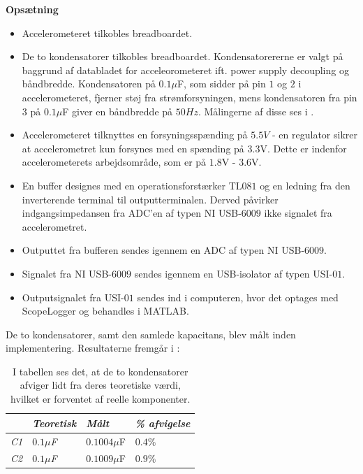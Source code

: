 \textbf{Opsætning}\label{Opsaetning}
\begin{itemize}
\item Accelerometeret tilkobles breadboardet.
\item De to kondensatorer tilkobles breadboardet. Kondensatorererne er valgt på baggrund af databladet for acceleorometeret ift. power supply decoupling og båndbredde. Kondensatoren på $0.1\mu$F, som sidder på pin $1$ og $2$ i accelerometeret, fjerner støj fra strømforsyningen, mens kondensatoren fra pin $3$ på $0.1\mu$F giver en båndbredde på $50Hz$. Målingerne af disse ses i .
\item Accelerometeret tilknyttes en forsyningsspænding på $5.5V$ - en regulator sikrer at accelerometret kun forsynes med en spænding på $3.3$V. Dette er indenfor accelerometerets arbejdsområde, som er på $1.8$V -  $3.6$V.
\item En buffer designes med en operationsforstærker TL$081$ og en ledning fra den inverterende terminal til outputterminalen. Derved påvirker indgangsimpedansen fra ADC'en af typen NI USB-$6009$ ikke signalet fra accelerometret.
\item Outputtet fra bufferen sendes igennem en ADC af typen NI USB-$6009$.
\item Signalet fra NI USB-$6009$ sendes igennem en USB-isolator af typen USI-$01$.
\item Outputsignalet fra USI-$01$ sendes ind i computeren, hvor det optages med ScopeLogger og behandles i MATLAB.
\end{itemize}

\noindent De to kondensatorer, samt den samlede kapacitans, blev målt inden implementering. Resultaterne fremgår i  :
\begin{table}[H]
	\centering
	\begin{tabular}{|l|l|l|l|}\cline{2-4} \multicolumn{1}{l|}{}
		& \textit{Teoretisk} & \textit{Målt} & \textit{\% afvigelse} \\ \hline
		\textit{C1}       & \textit{$0.1\mu$F} & $0.1004\mu$F  & $0.4\%$               \\ \hline		
		\textit{C2}       & \textit{$0.1\mu$F} & $0.1009\mu$F  & $0.9\%$               \\ \hline
	\end{tabular}
	\caption{I tabellen ses det, at de to kondensatorer afviger lidt fra deres teoretiske værdi, hvilket er forventet af reelle komponenter.}
	\label{Tab:Acc_kondensator_pilot}
\end{table}


